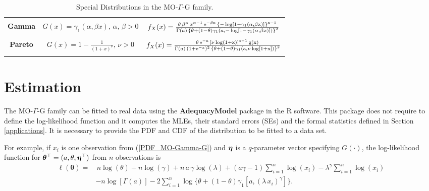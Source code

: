 \documentclass[12pt,a4paper]{article} %
\newcommand{\etn}{{\mbox{\boldmath $\eta$}}}
\begin{document}
\begin{landscape}
\begin{table}[htbp]
\begin{tabular}{c|c|c}
\hline
{} & {} & {} \\
\textbf{Gamma} &  $G(x)=\gamma_1(\alpha,\beta x),\,\alpha,\,\beta>0$ & $f_{X}(x)=\frac{\theta\,\beta^{\alpha}\,x^{\alpha-1}\,\rm{e}^{-\beta x}\,\left\{ -\log[1-\gamma_1(\alpha,\beta x)] \right\}^{a-1}}{\Gamma(a)\,\left\{\theta+(1-\theta)\gamma_1\left( a, -\log \left[1-\gamma_1(\alpha,\beta x)\right]\right)\right\}^{2}}$ \\
{} & {} & {} \\                                                                                                                                                                                                                                                                           \hline
\textbf{Pareto} &  $G(x)=1-\frac{1}{(1+x)^\nu},\,\nu>0$ & $f_{X}(x)=\frac{\theta \, \rm{e}^{-x}\, \left[\nu\log(1+x)\right]^{a-1}\, g(x)}{\Gamma(a)\,(1+\rm{e}^{-x})^2\,\left\{\theta+(1-\theta)\gamma_1\left( a, \nu\log[1+x]\right)\right\}^{2}}$\\
{} & {} & {} \\
\hline
\end{tabular}
\caption{Special Distributions in the  MO-$\Gamma$-G family.}
\end{table}
\end{landscape}

\section{Estimation}\label{estimation}

The  MO-$\Gamma$-G family can be  fitted to real data using the {\bf AdequacyModel} package in the {\sf R} software.
This packa\-ge does not require to define the log-likelihood function and it computes the MLEs, their standard errors (SEs)
and the formal statistics defined in Section \ref{applications}. It is necessary to provide the
PDF and CDF of the distribution to be fitted to a data set.

For example, if $x_i$ is one observation from (\ref{PDF_MO-Gamma-G}) and $\etn$ is a $q$-parameter vector specifying $G(\cdot)$,
the log-likelihood function for $\boldsymbol{\theta}^\top=(a,\theta,\etn^\top)$ from $n$ observations is
\begin{align}\label{loglik}
\ell (\boldsymbol{\theta})=&\,n\log (\theta)+n\log(\gamma)+n\, a\, \gamma \log(\lambda)+(a\gamma-1)\sum_{i=1}^n{\log(x_i)}-\lambda^\gamma\sum_{i=1}^n{\log(x_i)}\nonumber \\ &
-n\log[\Gamma(a)]-2\sum_{i=1}^n{\log\{\theta+(1-\theta)\gamma_1[a,(\lambda\,x_i)^\gamma]\}}.
\end{align}
\end{document}
